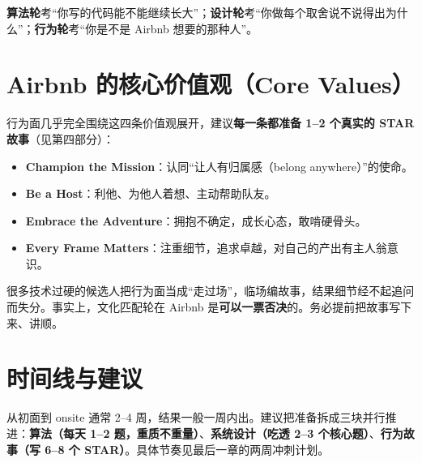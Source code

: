 \begin{keypoint}[一句话区分]
\textbf{算法轮}考“你写的代码能不能继续长大”；\textbf{设计轮}考“你做每个取舍说不说得出为什么”；\textbf{行为轮}考“你是不是 Airbnb 想要的那种人”。
\end{keypoint}

\section{Airbnb 的核心价值观（Core Values）}

行为面几乎完全围绕这四条价值观展开，建议\textbf{每一条都准备 1--2 个真实的 STAR 故事}（见第四部分）：

\begin{itemize}
  \item \textbf{Champion the Mission}：认同“让人有归属感（belong anywhere）”的使命。
  \item \textbf{Be a Host}：利他、为他人着想、主动帮助队友。
  \item \textbf{Embrace the Adventure}：拥抱不确定，成长心态，敢啃硬骨头。
  \item \textbf{Every Frame Matters}：注重细节，追求卓越，对自己的产出有主人翁意识。
\end{itemize}

\begin{pitfall}[最容易被低估的一轮]
很多技术过硬的候选人把行为面当成“走过场”，临场编故事，结果细节经不起追问而失分。事实上，文化匹配轮在 Airbnb 是\textbf{可以一票否决}的。务必提前把故事写下来、讲顺。
\end{pitfall}

\section{时间线与建议}

从初面到 onsite 通常 2--4 周，结果一般一周内出。建议把准备拆成三块并行推进：\textbf{算法（每天 1--2 题，重质不重量）}、\textbf{系统设计（吃透 2--3 个核心题）}、\textbf{行为故事（写 6--8 个 STAR）}。具体节奏见最后一章的两周冲刺计划。
